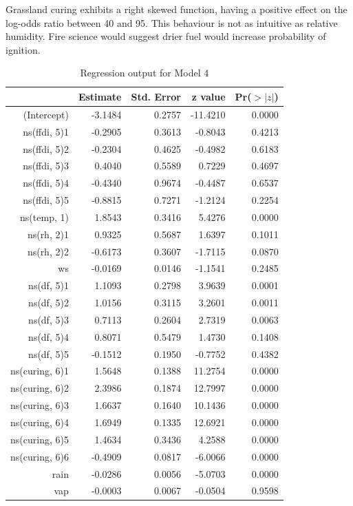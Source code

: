 \documentclass[11pt,a4paper]{article}
\begin{document}
Grassland curing exhibits a right skewed function, having a positive effect on the log-odds ratio between 40 and 95. This behaviour is not as intuitive as relative humidity. Fire science would suggest drier fuel would increase probability of ignition.

\begin{table}
  \centering
  \begin{tabular}{rrrrr}
    \toprule
                   & Estimate & Std. Error & z value  & Pr($>|z|$) \\
    \midrule
    (Intercept)    & -3.1484  & 0.2757     & -11.4210 & 0.0000 \\
    ns(ffdi, 5)1   & -0.2905  & 0.3613     & -0.8043  & 0.4213 \\
    ns(ffdi, 5)2   & -0.2304  & 0.4625     & -0.4982  & 0.6183 \\
    ns(ffdi, 5)3   & 0.4040   & 0.5589     & 0.7229   & 0.4697 \\
    ns(ffdi, 5)4   & -0.4340  & 0.9674     & -0.4487  & 0.6537 \\
    ns(ffdi, 5)5   & -0.8815  & 0.7271     & -1.2124  & 0.2254 \\
    ns(temp, 1)    & 1.8543   & 0.3416     & 5.4276   & 0.0000 \\
    ns(rh, 2)1     & 0.9325   & 0.5687     & 1.6397   & 0.1011 \\
    ns(rh, 2)2     & -0.6173  & 0.3607     & -1.7115  & 0.0870 \\
    ws             & -0.0169  & 0.0146     & -1.1541  & 0.2485 \\
    ns(df, 5)1     & 1.1093   & 0.2798     & 3.9639   & 0.0001 \\
    ns(df, 5)2     & 1.0156   & 0.3115     & 3.2601   & 0.0011 \\
    ns(df, 5)3     & 0.7113   & 0.2604     & 2.7319   & 0.0063 \\
    ns(df, 5)4     & 0.8071   & 0.5479     & 1.4730   & 0.1408 \\
    ns(df, 5)5     & -0.1512  & 0.1950     & -0.7752  & 0.4382 \\
    ns(curing, 6)1 & 1.5648   & 0.1388     & 11.2754  & 0.0000 \\
    ns(curing, 6)2 & 2.3986   & 0.1874     & 12.7997  & 0.0000 \\
    ns(curing, 6)3 & 1.6637   & 0.1640     & 10.1436  & 0.0000 \\
    ns(curing, 6)4 & 1.6949   & 0.1335     & 12.6921  & 0.0000 \\
    ns(curing, 6)5 & 1.4634   & 0.3436     & 4.2588   & 0.0000 \\
    ns(curing, 6)6 & -0.4909  & 0.0817     & -6.0066  & 0.0000 \\
    rain           & -0.0286  & 0.0056     & -5.0703  & 0.0000 \\
    vap            & -0.0003  & 0.0067     & -0.0504  & 0.9598 \\
    \bottomrule
  \end{tabular}
  \caption{Regression output for Model 4}
  \label{table:logf}
\end{table}
\end{document}
